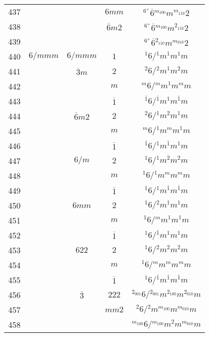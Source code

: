 \begin{longtable}{ccccc}
  437 &  &  & $6mm$ & ${}^{6^{+}} \overline{6} {}^{m_{100}} m {}^{m_{1\overline{1}0}} 2 $\\
  438 &  &  & $\overline{6}m2$ & ${}^{6^{+}} \overline{6} {}^{m_{100}} m {}^{2_{1\overline{1}0}} 2 $\\
  439 &  &  &  & ${}^{6^{+}} \overline{6} {}^{2_{1\overline{1}0}} m {}^{m_{010}} 2 $\\
  440 & $6/mmm$ & $6/mmm$ & $1$ & ${}^{1} 6  / {}^{1} m {}^{1} m {}^{1} m $\\
  441 &  & $\overline{3}m$ & $2$ & ${}^{2} 6  / {}^{2} m {}^{1} m {}^{2} m $\\
  442 &  &  & $m$ & ${}^{m} 6  / {}^{m} m {}^{1} m {}^{m} m $\\
  443 &  &  & $\overline{1}$ & ${}^{\overline{1}} 6  / {}^{\overline{1}} m {}^{1} m {}^{\overline{1}} m $\\
  444 &  & $\overline{6}m2$ & $2$ & ${}^{2} 6  / {}^{1} m {}^{2} m {}^{1} m $\\
  445 &  &  & $m$ & ${}^{m} 6  / {}^{1} m {}^{m} m {}^{1} m $\\
  446 &  &  & $\overline{1}$ & ${}^{\overline{1}} 6  / {}^{1} m {}^{\overline{1}} m {}^{1} m $\\
  447 &  & $6/m$ & $2$ & ${}^{1} 6  / {}^{1} m {}^{2} m {}^{2} m $\\
  448 &  &  & $m$ & ${}^{1} 6  / {}^{1} m {}^{m} m {}^{m} m $\\
  449 &  &  & $\overline{1}$ & ${}^{1} 6  / {}^{1} m {}^{\overline{1}} m {}^{\overline{1}} m $\\
  450 &  & $6mm$ & $2$ & ${}^{1} 6  / {}^{2} m {}^{1} m {}^{1} m $\\
  451 &  &  & $m$ & ${}^{1} 6  / {}^{m} m {}^{1} m {}^{1} m $\\
  452 &  &  & $\overline{1}$ & ${}^{1} 6  / {}^{\overline{1}} m {}^{1} m {}^{1} m $\\
  453 &  & $622$ & $2$ & ${}^{1} 6  / {}^{2} m {}^{2} m {}^{2} m $\\
  454 &  &  & $m$ & ${}^{1} 6  / {}^{m} m {}^{m} m {}^{m} m $\\
  455 &  &  & $\overline{1}$ & ${}^{1} 6  / {}^{\overline{1}} m {}^{\overline{1}} m {}^{\overline{1}} m $\\
  456 &  & $\overline{3}$ & $222$ & ${}^{2_{001}} 6  / {}^{2_{001}} m {}^{2_{100}} m {}^{2_{010}} m $\\
  457 &  &  & $mm2$ & ${}^{2} 6  / {}^{2} m {}^{m_{100}} m {}^{m_{010}} m $\\
  458 &  &  &  & ${}^{m_{100}} 6  / {}^{m_{100}} m {}^{2} m {}^{m_{010}} m $\\

\end{longtable}
